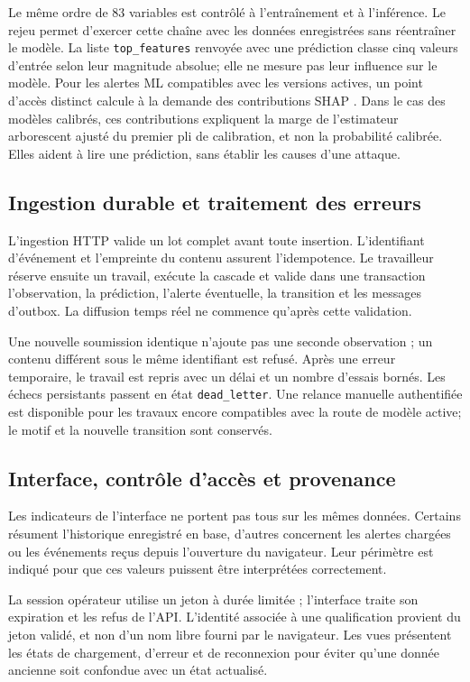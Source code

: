 Le même ordre de 83 variables est contrôlé à l'entraînement et à l'inférence.
Le rejeu permet d'exercer cette chaîne avec les données enregistrées sans
réentraîner le modèle. La liste \texttt{top\_features} renvoyée avec une
prédiction classe cinq valeurs d'entrée selon leur magnitude absolue; elle ne
mesure pas leur influence sur le modèle. Pour les alertes ML compatibles avec
les versions actives, un point d'accès distinct calcule à la demande des
contributions SHAP \citep{lundberg_unified_2017}. Dans le cas des modèles
calibrés, ces contributions expliquent la marge de l'estimateur arborescent
ajusté du premier pli de calibration, et non la probabilité calibrée. Elles
aident à lire une prédiction, sans établir les causes d'une attaque.

\subsection{Ingestion durable et traitement des erreurs}

L'ingestion HTTP valide un lot complet avant toute insertion. L'identifiant
d'\'ev\'enement et l'empreinte du contenu assurent l'idempotence. Le travailleur
r\'eserve ensuite un travail, ex\'ecute la cascade et valide dans une transaction
l'observation, la pr\'ediction, l'alerte \'eventuelle, la transition et les
messages d'outbox. La diffusion temps r\'eel ne commence qu'apr\`es cette
validation.

Une nouvelle soumission identique n'ajoute pas une seconde observation ; un
contenu différent sous le même identifiant est refusé. Après une erreur
temporaire, le travail est repris avec un délai et un nombre d'essais bornés.
Les échecs persistants passent en état \texttt{dead\_letter}. Une relance
manuelle authentifiée est disponible pour les travaux encore compatibles avec
la route de modèle active; le motif et la nouvelle transition sont conservés.

\subsection{Interface, contrôle d'accès et provenance}

Les indicateurs de l'interface ne portent pas tous sur les mêmes données.
Certains résument l'historique enregistré en base, d'autres concernent les
alertes chargées ou les événements reçus depuis l'ouverture du navigateur.
Leur périmètre est indiqué pour que ces valeurs puissent être interprétées
correctement.

La session opérateur utilise un jeton à durée limitée ; l'interface traite
son expiration et les refus de l'API. L'identité associée à une qualification
provient du jeton validé, et non d'un nom libre fourni par le navigateur.
Les vues présentent les états de chargement, d'erreur et de reconnexion pour
éviter qu'une donnée ancienne soit confondue avec un état actualisé.

